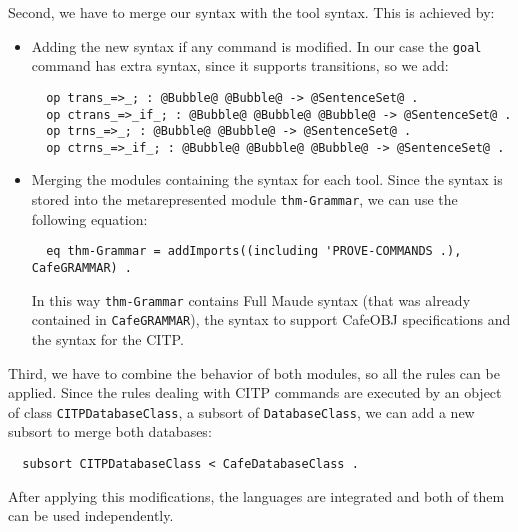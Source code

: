 Second, we have to merge our syntax with the tool syntax. This is achieved by:
\begin{itemize}
\item
Adding the new syntax if any command is modified. In our case the \verb"goal"
command has extra syntax, since it supports transitions, so we add: 

{\codesize
\begin{verbatim}
  op trans_=>_; : @Bubble@ @Bubble@ -> @SentenceSet@ .
  op ctrans_=>_if_; : @Bubble@ @Bubble@ @Bubble@ -> @SentenceSet@ .
  op trns_=>_; : @Bubble@ @Bubble@ -> @SentenceSet@ .
  op ctrns_=>_if_; : @Bubble@ @Bubble@ @Bubble@ -> @SentenceSet@ .
\end{verbatim}
}

\item
Merging the modules containing the syntax for each tool. Since the syntax is
stored into the metarepresented module \texttt{thm-Grammar}, we can use the
following equation:

{\codesize
\begin{verbatim}
  eq thm-Grammar = addImports((including 'PROVE-COMMANDS .), CafeGRAMMAR) .
\end{verbatim}
}

In this way \verb"thm-Grammar" contains Full Maude syntax (that was already contained
in \texttt{CafeGRAMMAR}), the syntax to support CafeOBJ specifications and the
syntax for the CITP.
\end{itemize}

Third, we have to combine the behavior of both modules, so all the rules can be applied.
Since the rules dealing with CITP commands are executed by an object of class
\verb"CITPDatabaseClass", a subsort of \texttt{DatabaseClass}, we can add a new
subsort to merge both databases:

{\codesize
\begin{verbatim}
  subsort CITPDatabaseClass < CafeDatabaseClass .
\end{verbatim}
}

After applying this modifications, the languages are integrated and both of them can
be used independently.





